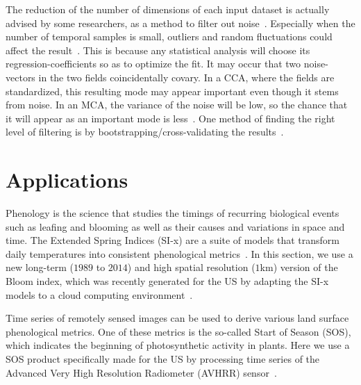 \documentclass{acm_proc_article-sp}
\begin{document}
The reduction of the number of dimensions of each input dataset is actually advised by some researchers, as a method to filter out noise~\cite{Barnett1987}. Especially when the number of temporal samples is small, outliers and random fluctuations could affect the result~\cite{Bretherton1992}. This is because any statistical analysis will choose its regression-coefficients so as to optimize the fit. It may occur that two noise-vectors in the two fields coincidentally covary. In a CCA, where the fields are standardized, this resulting mode may appear important even though it stems from noise. In an MCA, the variance of the noise will be low, so the chance that it will appear as an important mode is less~\cite{Bretherton1992}. One method of finding the right level of filtering is by bootstrapping/cross-validating the results~\cite{Livezey1999}.


\section{Applications}
\label{Applications}

Phenology is the science that studies the timings of recurring biological events such as leafing and blooming as well as their causes and variations in space and time. The Extended Spring Indices (SI-x) are a suite of models that transform daily temperatures into consistent phenological metrics~\cite{Schwartz2013}. In this section, we use a new long-term ($1989$ to $2014$) and high spatial resolution ($1$km) version of the Bloom index, which was recently generated for the US by adapting the SI-x models to a cloud computing environment~\cite{Izquierdo2015}.

Time series of remotely sensed images can be used to derive various land surface phenological metrics. One of these metrics is the so-called Start of Season (SOS), which indicates the beginning of photosynthetic activity in plants. Here we use a SOS product specifically made for the US by processing time series of the Advanced Very High Resolution Radiometer (AVHRR) sensor~\cite{Reed1994}.
\end{document}
